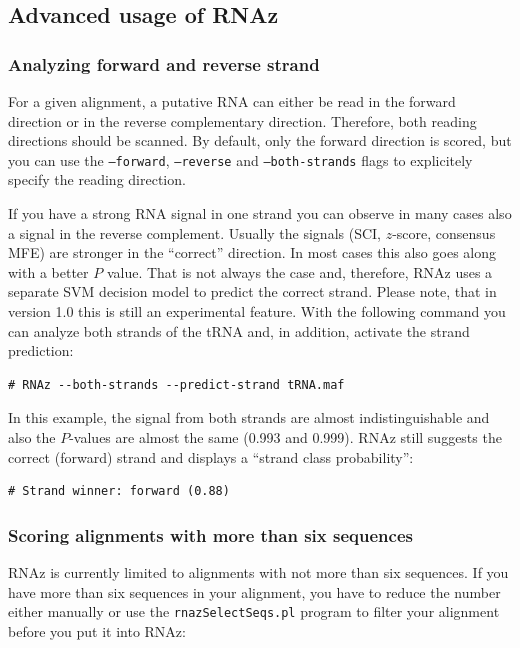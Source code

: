 \documentclass[11pt]{article}
\begin{document}
\subsection{Advanced usage of RNAz}

\subsubsection{Analyzing forward and reverse strand}

For a given alignment, a putative RNA can either be read in the forward
direction or in the reverse complementary direction. Therefore, both
reading directions should be scanned. By default, only the forward
direction is scored, but you can use the \texttt{--forward},
\texttt{--reverse} and \texttt{--both-strands} flags to explicitely specify the
reading direction. 

If you have a strong RNA signal in one strand you can observe in many cases
also a signal in the reverse complement.  Usually the signals (SCI,
$z$-score, consensus MFE) are stronger in the ``correct'' direction. In
most cases this also goes along with a better $P$ value.  That is not
always the case and, therefore, RNAz uses a separate SVM decision model to
predict the correct strand. Please note, that in version 1.0 this is still
an experimental feature. With the following command you can analyze both
strands of the tRNA and, in addition, activate the strand prediction:

\begin{verbatim}
# RNAz --both-strands --predict-strand tRNA.maf
\end{verbatim}

In this example, the signal from both strands are almost indistinguishable
and also the $P$-values are almost the same (0.993 and 0.999).
RNAz still suggests the correct (forward) strand and displays a
``strand class probability'':

\begin{verbatim}
# Strand winner: forward (0.88)
\end{verbatim}

\subsubsection{Scoring alignments with more than six sequences}
\label{sec:scor-large-alignm}

RNAz is currently limited to alignments with not more than six sequences.
If you have more than six sequences in your alignment, you have to reduce
the number either manually or use the \texttt{rnazSelectSeqs.pl} program to
filter your alignment before you put it into RNAz:
\end{document}
